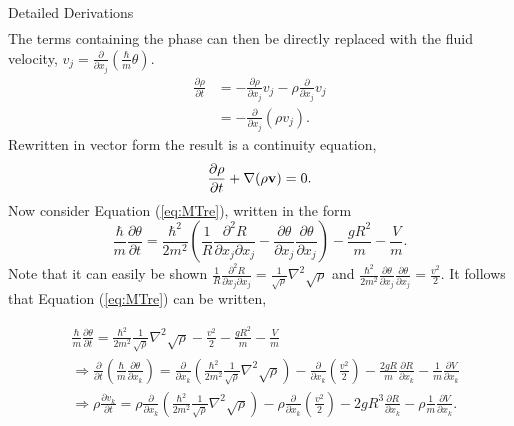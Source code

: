 \begin{chapter}{Detailed Derivations\label{app:App2}}
\begin{align*}
\end{align*}
The terms containing the phase can then be directly replaced with the fluid velocity, $v_j = \frac{\partial}{\partial x_j}\left( \frac{\hbar}{m} \theta \right)$.
\begin{align*}
  \frac{\partial \rho}{\partial t} &= -\frac{\partial \rho}{\partial x_j} v_j - \rho \frac{\partial}{\partial x_j} v_j\\
                   &= -\frac{\partial}{\partial x_j} \left( \rho v_j \right).
\end{align*}
Rewritten in vector form the result is a continuity equation,
\begin{equation}
  \frac{\partial \rho}{\partial t} + \nabla(\rho{\bf v}) = 0.
  \label{eq:MTcont}
\end{equation}
Now consider Equation (\ref{eq:MTre}), written in the form
\begin{equation*}
\frac{\hbar}{m} \frac{\partial \theta}{\partial t} = \frac{\hbar^2}{2m^2} \left( \frac{1}{R} \frac{\partial^2 R}{\partial x_j \partial x_j} - \frac{\partial \theta}{\partial x_j}\frac{\partial \theta}{\partial x_j}  \right) - \frac{gR^2}{m} - \frac{V}{m}.
\end{equation*}
Note that it can easily be shown $\frac{1}{R} \frac{\partial^2 R}{\partial x_j \partial x_j} = \frac{1}{\sqrt{\rho}}\nabla^2\sqrt{\rho}$ and $\frac{\hbar^2}{2m^2} \frac{\partial \theta}{\partial x_j}\frac{\partial \theta}{\partial x_j} = \frac{v^2}{2} $. It follows that Equation (\ref{eq:MTre}) can be written,

\begin{align*}
&\frac{\hbar}{m} \frac{\partial \theta}{\partial t} = \frac{\hbar^2}{2m^2} \frac{1}{\sqrt{\rho}} \nabla^2\sqrt{\rho} - \frac{v^2}{2} - \frac{gR^2}{m} - \frac{V}{m}\\
&\Rightarrow \frac{\partial}{\partial t}\left(\frac{\hbar}{m} \frac{\partial \theta}{\partial x_k}\right) = \frac{\partial}{\partial x_k}\left(\frac{\hbar^2}{2m^2} \frac{1}{\sqrt{\rho}} \nabla^2\sqrt{\rho} \right)- \frac{\partial}{\partial x_k} \left (\frac{v^2}{2}\right) - \frac{2gR}{m}\frac{\partial R}{\partial x_k} - \frac{1}{m}\frac{\partial V}{\partial x_k}\\
&\Rightarrow \rho\frac{\partial v_k}{\partial t} =\rho \frac{\partial}{\partial x_k}\left(\frac{\hbar^2}{2m^2} \frac{1}{\sqrt{\rho}} \nabla^2\sqrt{\rho} \right)- \rho\frac{\partial}{\partial x_k} \left (\frac{v^2}{2}\right) - 2gR^3\frac{\partial R}{\partial x_k} - \rho\frac{1}{m}\frac{\partial V}{\partial x_k}.
\end{align*}


\end{chapter}

